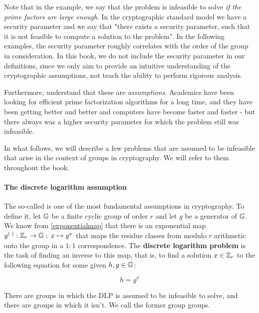 Note that in the example, we say that the problem is infeasible to solve \textit{if the prime factors are large enough}. In the cryptographic standard model we have a security parameter and we say that "there exists a security parameter, such that it is not feasible to compute a solution to the problem". In the following examples, the security parameter roughly correlates with the order of the group in consideration. In this book, we do not include the security parameter in our definitions, since we only aim to provide an intuitive understanding of the cryptographic assumptions, not teach the ability to perform rigorous analysis.

Furthermore, understand that these are \textit{assumptions}. Academics have been looking for efficient prime factorization algorithms for a long time, and they have been getting better and better and computers have become faster and faster - but there always was a higher security parameter for which the problem still was infeasible.%

In what follows, we will describe a few problems that are assumed to be infeasible that arise in the context of groups in cryptography. We will refer to them throughout the book.


\paragraph{The discrete logarithm assumption}
\label{def:DL-secure}
The so-called  is one of the most fundamental assumptions in cryptography.
To define it, let $\mathbb{G}$ be a finite cyclic group of order $r$ and let $g$ be a generator of $\mathbb{G}$.
We know from \ref{exponentialmap} that there is an exponential map $g^{(\cdot)}: \mathbb{Z}_r \to \mathbb{G}\; ;\; x\mapsto g^x$ that maps the residue classes from modulo $r$ arithmetic onto the group in a $1:1$ correspondence.
The \textbf{discrete logarithm problem} is the task of finding an inverse to this map, that is, to find a solution $x\in\mathbb{Z}_r$ to the following equation for some given $h, g \in \mathbb{G}$:

\begin{equation}
h = g^x
\end{equation}

There are groups in which the DLP is assumed to be infeasible to solve, and there are groups in which it isn't. We call the former group  groups.

